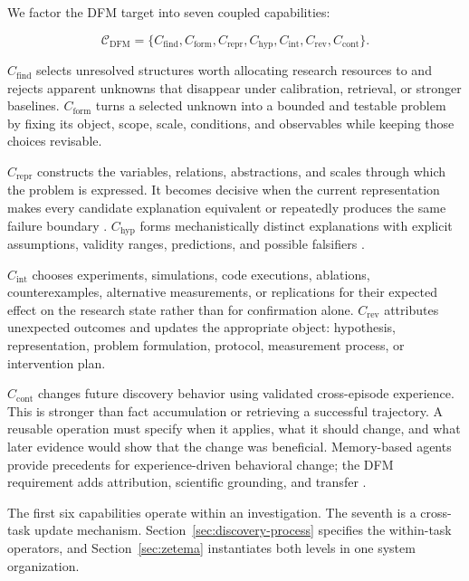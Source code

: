 \documentclass[11pt, a4paper, copyright]{google}
\begin{document}
We factor the DFM target into seven coupled capabilities:

\begin{equation}
\mathcal{C}_{\mathrm{DFM}}
=
\{C_{\mathrm{find}},C_{\mathrm{form}},C_{\mathrm{repr}},C_{\mathrm{hyp}},C_{\mathrm{int}},C_{\mathrm{rev}},C_{\mathrm{cont}}\}.
\label{eq:dfm-capabilities}
\end{equation}

$C_{\mathrm{find}}$ selects unresolved structures worth allocating research resources to and rejects apparent unknowns that disappear under calibration, retrieval, or stronger baselines. $C_{\mathrm{form}}$ turns a selected unknown into a bounded and testable problem by fixing its object, scope, scale, conditions, and observables while keeping those choices revisable.

$C_{\mathrm{repr}}$ constructs the variables, relations, abstractions, and scales through which the problem is expressed. It becomes decisive when the current representation makes every candidate explanation equivalent or repeatedly produces the same failure boundary \citep{brunton2016sindy,udrescu2020aifeynman,scholkopf2021causalrep}. $C_{\mathrm{hyp}}$ forms mechanistically distinct explanations with explicit assumptions, validity ranges, predictions, and possible falsifiers \citep{wang2024scimon,baek2025researchagent,gottweis2026coscientist}.

$C_{\mathrm{int}}$ chooses experiments, simulations, code executions, ablations, counterexamples, alternative measurements, or replications for their expected effect on the research state rather than for confirmation alone. $C_{\mathrm{rev}}$ attributes unexpected outcomes and updates the appropriate object: hypothesis, representation, problem formulation, protocol, measurement process, or intervention plan.

$C_{\mathrm{cont}}$ changes future discovery behavior using validated cross-episode experience. This is stronger than fact accumulation or retrieving a successful trajectory. A reusable operation must specify when it applies, what it should change, and what later evidence would show that the change was beneficial. Memory-based agents provide precedents for experience-driven behavioral change; the DFM requirement adds attribution, scientific grounding, and transfer \citep{shinn2023reflexion,wang2024voyager}.

The first six capabilities operate within an investigation. The seventh is a cross-task update mechanism. Section~\ref{sec:discovery-process} specifies the within-task operators, and Section~\ref{sec:zetema} instantiates both levels in one system organization.
\end{document}
